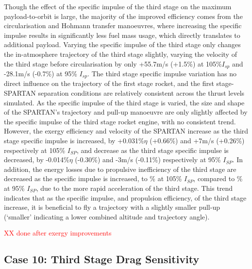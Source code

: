 Though the effect of the specific impulse of the third stage on the maximum payload-to-orbit is large, the majority of the improved efficiency comes from the circularisation and Hohmann transfer manoeuvres, where increasing the specific impulse results in significantly less fuel mass usage, which directly translates to additional payload. Varying the specific impulse of the third stage only changes the in-atmosphere trajectory of the third stage slightly, varying the velocity of the third stage before circularisation by only +55.7m/s (+1.5\%) at 105\%$I_{sp}$ and -28.1m/s (-0.7\%) at 95\% $I_{sp}$. 
The third stage specific impulse variation has no direct influence on the trajectory of the first stage rocket, and the first stage-SPARTAN separation conditions are relatively consistent across the thrust levels simulated.
As the specific impulse of the third stage is varied, the size and shape of the SPARTAN's trajectory and pull-up manoeuvre are only slightly affected by the specific impulse of the third stage rocket engine, with no consistent trend. 
 However, the exergy efficiency and velocity of the SPARTAN increase as the third stage specific impulse is increased, by +0.031\%$\eta$ (+0.66\%) and +7m/s (+0.26\%) respectively at 105\% $I_{SP}$, and decrease as the third stage specific impulse is decreased, by -0.014\%$\eta$ (-0.30\%) and -3m/s (-0.11\%) respectively at 95\% $I_{SP}$. 
 In addition, the energy losses due to propulsive inefficiency of the third stage are decreased as the specific impulse is increased, to \PlossthreeCombinedTThreeOneHundredTenNoReturn\% at 105\% $I_{SP}$, compared to \PlossthreeCombinedTThreeNinetyNoReturn\% at 95\% $I_{SP}$, due to the more rapid acceleration of the third stage.
 This trend indicates that as the specific impulse, and propulsion efficiency, of the third stage increase, it is beneficial to fly a trajectory with a slightly smaller pull-up (`smaller' indicating a lower combined altitude and trajectory angle).

\textcolor{red}{XX done after exergy improvements}


\subsection{Case 10: Third Stage Drag Sensitivity}

